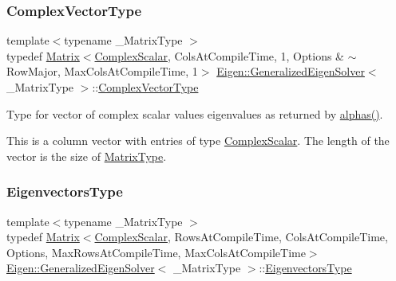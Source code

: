 \subsubsection{\texorpdfstring{ComplexVectorType}{ComplexVectorType}}
{\footnotesize\ttfamily template$<$typename \+\_\+\+Matrix\+Type $>$ \\
typedef \mbox{\hyperlink{class_eigen_1_1_matrix}{Matrix}}$<$\mbox{\hyperlink{class_eigen_1_1_generalized_eigen_solver_abdec07af91db1345bb4c74066e3d0ea7}{Complex\+Scalar}}, Cols\+At\+Compile\+Time, 1, Options \& $\sim$Row\+Major, Max\+Cols\+At\+Compile\+Time, 1$>$ \mbox{\hyperlink{class_eigen_1_1_generalized_eigen_solver}{Eigen\+::\+Generalized\+Eigen\+Solver}}$<$ \+\_\+\+Matrix\+Type $>$\+::\mbox{\hyperlink{class_eigen_1_1_generalized_eigen_solver_acfd144329aca76882069da2fc5d53ef5}{Complex\+Vector\+Type}}}



Type for vector of complex scalar values eigenvalues as returned by \mbox{\hyperlink{class_eigen_1_1_generalized_eigen_solver_a82b1bc41267f46e5c5899d5b084a73bb}{alphas()}}. 

This is a column vector with entries of type \mbox{\hyperlink{class_eigen_1_1_generalized_eigen_solver_abdec07af91db1345bb4c74066e3d0ea7}{Complex\+Scalar}}. The length of the vector is the size of \mbox{\hyperlink{class_eigen_1_1_generalized_eigen_solver_a56f4b9823bb9a267de3aaf48428cd247}{Matrix\+Type}}. \mbox{\label{class_eigen_1_1_generalized_eigen_solver_afffec018dbb2d87b4c09b6acecbb79cd}} 
\subsubsection{\texorpdfstring{EigenvectorsType}{EigenvectorsType}}
{\footnotesize\ttfamily template$<$typename \+\_\+\+Matrix\+Type $>$ \\
typedef \mbox{\hyperlink{class_eigen_1_1_matrix}{Matrix}}$<$\mbox{\hyperlink{class_eigen_1_1_generalized_eigen_solver_abdec07af91db1345bb4c74066e3d0ea7}{Complex\+Scalar}}, Rows\+At\+Compile\+Time, Cols\+At\+Compile\+Time, Options, Max\+Rows\+At\+Compile\+Time, Max\+Cols\+At\+Compile\+Time$>$ \mbox{\hyperlink{class_eigen_1_1_generalized_eigen_solver}{Eigen\+::\+Generalized\+Eigen\+Solver}}$<$ \+\_\+\+Matrix\+Type $>$\+::\mbox{\hyperlink{class_eigen_1_1_generalized_eigen_solver_afffec018dbb2d87b4c09b6acecbb79cd}{Eigenvectors\+Type}}}



